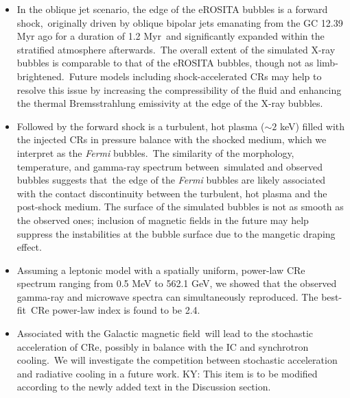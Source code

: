 \documentclass[fleqn,usenatbib,useAMS]{mnras}
\begin{document}
\begin{itemize}
\item In the oblique jet scenario, the edge of the eROSITA bubbles is a forward shock,\
      originally driven by oblique bipolar jets emanating from the GC 12.39 Myr ago for a duration of 1.2 Myr\
      and significantly expanded within the stratified atmosphere afterwards.\
      The overall extent of the simulated X-ray bubbles is comparable to that of the eROSITA bubbles, though not as limb-brightened.\
      Future models including shock-accelerated CRs may help to resolve this issue by increasing the compressibility of the fluid and enhancing the thermal Bremsstrahlung emissivity at the edge of the X-ray bubbles.
\item Followed by the forward shock is a turbulent, hot plasma ($\sim2$ keV) filled with the injected CRs in pressure balance with the shocked medium, which we interpret as the \textit{Fermi} bubbles.\
      The similarity of the morphology, temperature, and gamma-ray spectrum between\
      simulated and observed bubbles suggests that\
      the edge of the \textit{Fermi} bubbles are likely associated with the contact discontinuity between the turbulent, hot plasma and the post-shock medium. The surface of the simulated bubbles is not as smooth as the observed ones; inclusion of magnetic fields in the future may help suppress the instabilities at the bubble surface due to the mangetic draping effect.
\item Assuming a leptonic model with a spatially uniform, power-law CRe spectrum ranging from 0.5 MeV to 562.1 GeV, we showed that the observed gamma-ray and microwave spectra can simultaneously reproduced. The best-fit\
      CRe power-law index is found to be 2.4.
\item Associated with the Galactic magnetic field\
      will lead to the stochastic acceleration of CRe,
      possibly in balance with the IC and synchrotron cooling.\
      We will investigate the competition between stochastic acceleration and radiative cooling
      in a future work.
      {\color{red} KY: This item is to be modified according to the newly added text in the Discussion section.}
\end{itemize}
\end{document}

